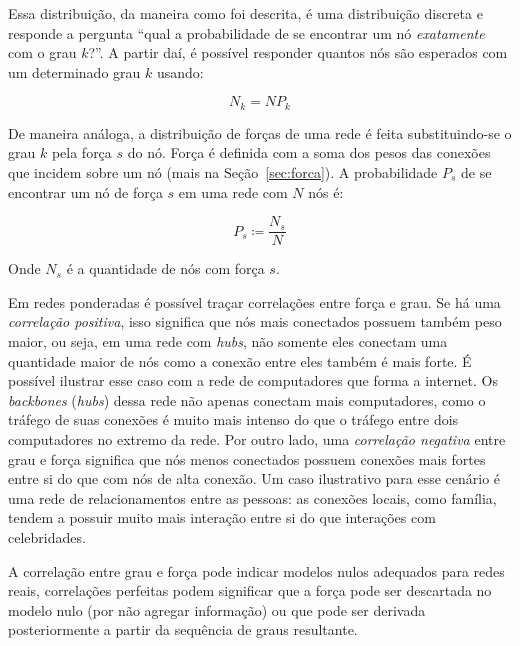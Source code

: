 \documentclass[12pt,a4paper]{article}
\theoremstyle{hypo}
\newcommand{\defn}{\coloneqq} %
\begin{document}
Essa distribuição, da maneira como foi descrita, é uma distribuição discreta e responde a pergunta \enquote{qual a probabilidade de se encontrar um nó \textit{exatamente}~ com o grau $k$?}. A partir daí, é possível responder quantos nós são esperados com um determinado grau $k$ usando:

\begin{equation}
N_k = NP_k
\end{equation} 

De maneira análoga, a distribuição de forças de uma rede é feita substituindo-se o grau $k$ pela força $s$ do nó. Força é definida com a soma dos pesos das conexões que incidem sobre um nó (mais na Seção~\ref{sec:forca}). A probabilidade $P_s$ de se encontrar um nó de força $s$ em uma rede com $N$ nós é:

\begin{equation} \label{eq:probabilidade-forca}
P_s \defn \frac{N_s}{N}
\end{equation}

Onde $N_s$ é a quantidade de nós com força $s$.

Em redes ponderadas é possível traçar correlações entre força e grau. Se há uma \textit{correlação positiva}, isso significa que nós mais conectados possuem também peso maior, ou seja, em uma rede com \textit{hubs}, não somente eles conectam uma quantidade maior de nós como a conexão entre eles também é mais forte. É possível ilustrar esse caso com a rede de computadores que forma a internet. Os \textit{backbones} (\textit{hubs}) dessa rede não apenas conectam mais computadores, como o tráfego de suas conexões é muito mais intenso do que o tráfego entre dois computadores no extremo da rede. Por outro lado, uma \textit{correlação negativa} entre grau e força significa que nós menos conectados possuem conexões mais fortes entre si do que com nós de alta conexão. Um caso ilustrativo para esse cenário é uma rede de relacionamentos entre as pessoas: as conexões locais, como família, tendem a possuir muito mais interação entre si do que interações com celebridades.

A correlação entre grau e força pode indicar modelos nulos adequados para redes reais, correlações perfeitas podem significar que a força pode ser descartada no modelo nulo (por não agregar informação) ou que pode ser derivada posteriormente a partir da sequência de graus resultante.
\end{document}
